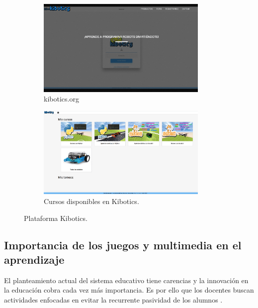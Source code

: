 \begin{figure}[H]
  \begin{subfigure}[b]{0.5\textwidth}
  \centering
    \includegraphics[width=0.9\textwidth, height=0.6\textwidth]{chapters/images/kiboticsorg.png}
    \caption{kibotics.org}
    \label{fig:f1}
  \end{subfigure}
  \hfill
  \begin{subfigure}[b]{0.5\textwidth}
  \centering
    \includegraphics[width=0.9\textwidth, height=0.6\textwidth]{chapters/images/kibotics.png}
    \caption{Cursos disponibles en Kibotics.}
    \label{fig:f2}
  \end{subfigure}
  \caption{Plataforma Kibotics.}
\end{figure}
 
\subsection{Importancia de los juegos y multimedia en el aprendizaje} 
El planteamiento actual del sistema educativo tiene carencias y la innovación en la educación cobra cada vez más importancia. Es por ello que los docentes buscan actividades enfocadas en evitar la recurrente pasividad de los alumnos \cite{multimedia}.


